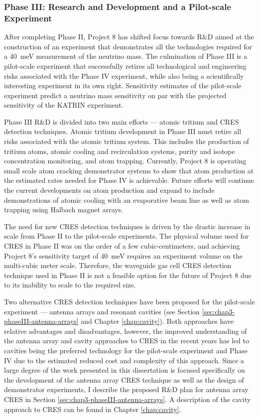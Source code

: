 \subsubsection*{Phase III: Research and Development and a Pilot-scale Experiment}

After completing Phase II, Project 8 has shifted focus towards R\&D aimed at the construction of an experiment that demonstrates all the technologies required for a 40~meV measurement of the neutrino mass. The culmination of Phase III is a pilot-scale experiment that successfully retires all technological and engineering risks associated with the Phase IV experiment, while also being a scientifically interesting experiment in its own right. Sensitivity estimates of the pilot-scale experiment predict a neutrino mass sensitivity on par with the projected sensitivity of the KATRIN experiment. 

Phase III R\&D is divided into two main efforts --- atomic tritium and CRES detection techniques. Atomic tritium development in Phase III must retire all risks associated with the atomic tritium system. This includes the production of tritium atoms, atomic cooling and recirculation systems, purity and isotope concentration monitoring, and atom trapping. Currently, Project 8 is operating small scale atom cracking demonstrator systems to show that atom production at the estimated rates needed for Phase IV is achievable. Future efforts will continue the current developments on atom production and expand to include demonstrations of atomic cooling with an evaporative beam line as well as atom trapping using Halbach magnet arrays.

The need for new CRES detection techniques is driven by the drastic increase in scale from Phase II to the pilot-scale experiments. The physical volume used for CRES in Phase II was on the order of a few cubic-centimeters, and achieving Project 8's sensitivity target of 40~meV requires an experiment volume on the multi-cubic meter scale. Therefore, the waveguide gas cell CRES detection technique used in Phase II is not a feasible option for the future of Project 8 due to its inability to scale to the required size.

Two alternative CRES detection techniques have been proposed for the pilot-scale experiment --- antenna arrays and resonant cavities (see Section \ref{sec:chap3-phaseIII-antenna-arrays} and Chapter \ref{chap:cavity}). Both approaches have relative advantages and disadvantages, however, the improved understanding of the antenna array and cavity approaches to CRES in the recent years has led to cavities being the preferred technology for the pilot-scale experiment and Phase IV due to the estimated reduced cost and complexity of this approach. Since a large degree of the work presented in this dissertation is focused specifically on the development of the antenna array CRES technique as well as the design of demonstrator experiments, I describe the proposed R\&D plan for antenna array CRES in Section \ref{sec:chap3-phaseIII-antenna-arrays}. A description of the cavity approach to CRES can be found in Chapter \ref{chap:cavity}.

